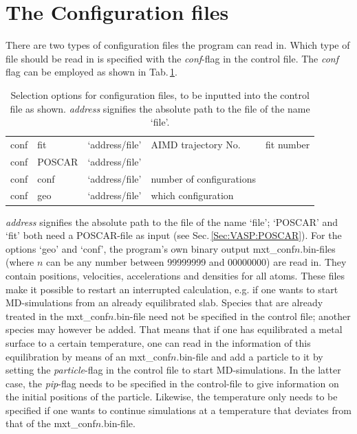 \documentclass[twoside, 11pt, titlepage, captions=nooneline, a4paper, headsepline]{scrbook}%
\newcommand{\9}{\mathrm}
\newcommand{\0}{\,\mathrm}
\begin{document}
\section{The Configuration files}
\label{Sec:mxt:input}
There are two types of configuration files the program can read in. Which type of file should be read in is specified with the \textit{conf}-flag in the control file. The \textit{conf} flag can be employed as shown in Tab.\,\ref{Tab:mxt:conf}.
\begin{table}[b!]
\centering
\caption{Selection options for configuration files, to be inputted into the control file as shown. \textit{address} signifies the absolute path to the file of the name `file'.}
\label{Tab:mxt:conf}
\begin{tabular}{p{1cm}p{2cm}p{2cm}p{4.5cm}p{3cm}}
\hline\hline
conf\index{conf} & fit & `address/file' & AIMD trajectory No. & fit number\\
conf & POSCAR & `address/file' & &\\
conf & conf & `address/file' & number of configurations&\\
conf & geo & `address/file' & which configuration&\\
\hline
\hline
\end{tabular}
\end{table}
\textit{address} signifies the absolute path to the file of the name `file'; `POSCAR' and `fit' both need a POSCAR-file as input (see Sec.\,\ref{Sec:VASP:POSCAR}). For the options `geo' and `conf', the program's own binary output mxt\_conf$n$.bin-files (where $n$ can be any number between 99999999 and 00000000) are read in. They contain positions, velocities, accelerations and densities for all atoms. These files make it possible to restart an interrupted calculation, e.g. if one wants to start MD-simulations from an already equilibrated slab. Species that are already treated in the mxt\_conf$n$.bin-file need not be specified in the control file; another species may however be added. That means that if one has equilibrated a metal surface to a certain temperature, one can read in the information of this equilibration by means of an mxt\_conf$n$.bin-file and add a particle to it by setting the \textit{particle}-flag in the control file to start MD-simulations. In the latter case, the \textit{pip}-flag needs to be specified in the control-file to give information on the initial positions of the particle. Likewise, the temperature only needs to be specified if one wants to continue simulations at a temperature that deviates from that of the mxt\_conf$n$.bin-file.
\end{document}

